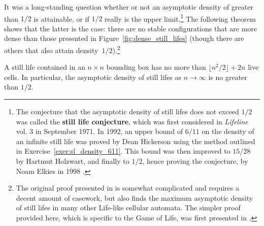 It was a long-standing question whether or not an asymptotic density of greater than $1/2$ is attainable, or if $1/2$ really is the upper limit.\footnote{The conjecture that the asymptotic density of still lifes does not exceed $1/2$ was called the \textbf{still life conjecture}, which was first considered in \emph{Lifeline} vol. 3 in September 1971. In 1992, an upper bound of $6/11$ on the density of an infinite still life was proved by Dean Hickerson using the method outlined in Exercise~\ref{exer:sl_density_611}. This bound was then improved to $15/28$ by Hartmut Holzwart, and finally to $1/2$, hence proving the conjecture, by Noam Elkies in 1998 \cite{Elk98}.} The following theorem shows that the latter is the case: there are no stable configurations that are more dense than those presented in Figure~\ref{fig:dense_still_lifes} (though there are others that also attain density~$1/2$).\footnote{The original proof presented in \cite{Elk98} is somewhat complicated and requires a decent amount of casework, but also finds the maximum asymptotic density of still lifes in many other Life-like cellular automata. The simpler proof provided here, which is specific to the Game of Life, was first presented in \cite{CSB09}.}

\begin{theorem}\label{thm:still_life_density}
	A still life contained in an $n \times n$ bounding box has no more than $\lfloor n^2/2 \rfloor + 2n$ live cells. In particular, the asymptotic density of still lifes as $n \rightarrow \infty$ is no greater than $1/2$.
\end{theorem}

